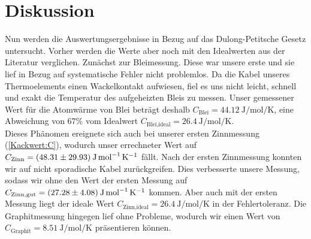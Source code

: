 \section{Diskussion}
\label{sec:Diskussion}
Nun werden die Auswertungsergebnisse in Bezug auf das Dulong-Petitsche Gesetz untersucht.
Vorher werden die Werte aber noch mit den Idealwerten aus der Literatur verglichen.
Zunächst zur Bleimessung.
Diese war unsere erste und sie lief in Bezug auf systematische Fehler nicht problemlos.
Da die Kabel unseres Thermoelements einen Wackelkontakt aufwiesen, fiel es uns nicht leicht, schnell und exakt die Temperatur des aufgeheizten Bleis zu messen.
Unser gemessener Wert für die Atomwärme von Blei beträgt deshalb $C_{\text{Blei}}=\SI{44,12}{\joule\per\mol\per\kelvin}$, eine Abweichung von $67\%$ vom Idealwert $C_{\text{Blei,ideal}}=\SI{26,4}{\joule\per\mol\per\kelvin}$.\\
Dieses Phänomen ereignete sich auch bei unserer ersten Zinnmessung (\ref{Kackwert:C}), wodurch unser errechneter Wert auf $C_{\text{Zinn}}=(\num{48,31 +- 29,93})\: \si{\joule\per\mol\per\kelvin}$ fällt.
Nach der ersten Zinnmessung konnten wir auf nicht sporadische Kabel zurückgreifen.
Dies verbesserte unsere Messung, sodass wir ohne den Wert der ersten Messung auf $C_{\text{Zinn,gut}}=(\num{27,28 +- 4,08})\: \si{\joule\per\mol\per\kelvin}$ kommen.
Aber auch mit der ersten Messung liegt der ideale Wert $C_{\text{Zinn,ideal}}=\SI{26,4}{\joule\per\mol\per\kelvin}$
in der Fehlertoleranz.
Die Graphitmessung hingegen lief ohne Probleme, wodurch wir einen Wert von $C_{\text{Graphit}}=\SI{8,51}{\joule\per\mol\per\kelvin}$ präsentieren können.
